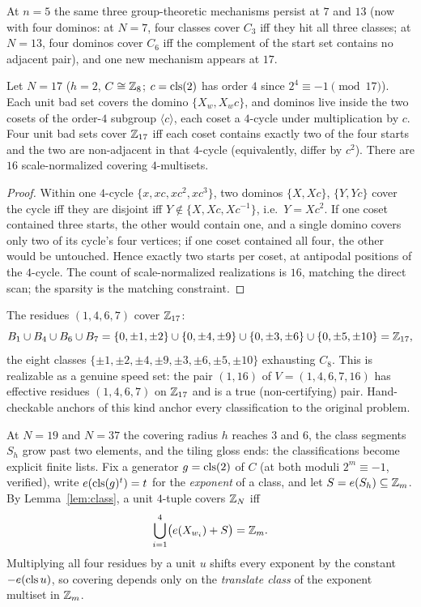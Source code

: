 At $n=5$ the same three group-theoretic mechanisms persist at
$7$ and $13$ (now with four dominos: at $N=7$, four classes cover
$C_3$ iff they hit all three classes; at $N=13$, four dominos cover
$C_6$ iff the complement of the start set contains no adjacent pair), and
one new mechanism appears at $17$.

\begin{theorem}\label{thm:K17}
Let $N=17$ ($h=2$, $C\cong\mathbb{Z}_8$; $c=\operatorname{cls}(2)$ has order $4$ since
$2^4\equiv-1 \pmod{17}$). Each unit bad set covers the domino
$\{X_w,X_wc\}$, and dominos live inside the two cosets of the order-$4$
subgroup $\langle c\rangle$, each coset a $4$-cycle under multiplication
by $c$. Four unit bad sets cover $\mathbb{Z}_{17}$ iff each coset contains
exactly two of the four starts and the two are non-adjacent in that
$4$-cycle (equivalently, differ by $c^2$). There are $16$
scale-normalized covering $4$-multisets.
\end{theorem}

\begin{proof}
Within one $4$-cycle $\{x,xc,xc^2,xc^3\}$, two dominos
$\{X,Xc\}$, $\{Y,Yc\}$ cover the cycle iff they are disjoint iff
$Y\notin\{X,Xc,Xc^{-1}\}$, i.e.\ $Y=Xc^2$. If one coset contained three
starts, the other would contain one, and a single domino covers only two
of its cycle's four vertices; if one coset contained all four, the other
would be untouched. Hence exactly two starts per coset, at antipodal
positions of the $4$-cycle. The count of scale-normalized realizations is
$16$, matching the direct scan; the sparsity is the matching constraint.
\end{proof}

\begin{example}\label{ex:17}
The residues $(1,4,6,7)$ cover $\mathbb{Z}_{17}$:
\[
B_1\cup B_4\cup B_6\cup B_7
=\{0,\pm1,\pm2\}\cup\{0,\pm4,\pm9\}\cup\{0,\pm3,\pm6\}
 \cup\{0,\pm5,\pm10\}=\mathbb{Z}_{17},
\]
the eight classes $\{\pm1,\pm2,\pm4,\pm9,\pm3,\pm6,\pm5,\pm10\}$
exhausting $C_8$. This is realizable as a genuine speed set: the pair
$(1,16)$ of $V=(1,4,6,7,16)$ has effective residues $(1,4,6,7)$ on
$\mathbb{Z}_{17}$ and is a true (non-certifying) pair. Hand-checkable anchors of
this kind anchor every classification to the original problem.
\end{example}

At $N=19$ and $N=37$ the covering radius $h$ reaches $3$ and $6$, the
class segments $S_h$ grow past two elements, and the tiling gloss ends:
the classifications become explicit finite lists. Fix a generator
$g=\operatorname{cls}(2)$ of $C$ (at both moduli $2^{m}\equiv -1$, verified), write
$e(\operatorname{cls}(g)^t)=t$ for the \emph{exponent} of a class, and let
$S=e(S_h)\subseteq\mathbb{Z}_m$. By Lemma~\ref{lem:class}, a unit $4$-tuple
covers $\mathbb{Z}_N$ iff
\[
\bigcup_{i=1}^{4}\bigl(e(X_{w_i})+S\bigr)=\mathbb{Z}_m .
\]
Multiplying all four residues by a unit $u$ shifts every exponent by the
constant $-e(\operatorname{cls} u)$, so covering depends only on the \emph{translate
class} of the exponent multiset in $\mathbb{Z}_m$.

